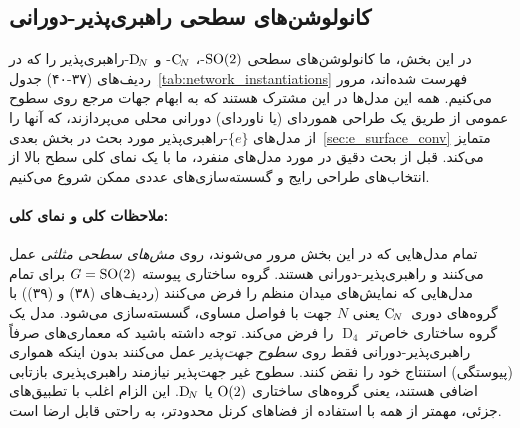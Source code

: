 

\subsection{کانولوشن‌های سطحی راهبری‌پذیر-دورانی}
\label{sec:so2_surface_conv}

در این بخش، ما کانولوشن‌های سطحی $\operatorname{SO}(2)$-، $\operatorname{C}_{\!N}$- و $\operatorname{D}_{\!N}$-راهبری‌پذیر را که در ردیف‌های (۳۷-۴۰) جدول~\ref{tab:network_instantiations} فهرست شده‌اند، مرور می‌کنیم.
همه این مدل‌ها در این مشترک هستند که به ابهام جهات مرجع روی سطوح عمومی از طریق یک طراحی هموردای (یا ناوردای) دورانی محلی می‌پردازند، که آنها را از مدل‌های $\{e\}$-راهبری‌پذیر مورد بحث در بخش بعدی~\ref{sec:e_surface_conv} متمایز می‌کند.
قبل از بحث دقیق در مورد مدل‌های منفرد، ما با یک نمای کلی سطح بالا از انتخاب‌های طراحی رایج و گسسته‌سازی‌های عددی ممکن شروع می‌کنیم.


\paragraph{ملاحظات کلی و نمای کلی:}
تمام مدل‌هایی که در این بخش مرور می‌شوند، روی \emph{مش‌های سطحی مثلثی} عمل می‌کنند و راهبری‌پذیر-دورانی هستند.
گروه ساختاری پیوسته $G=\operatorname{SO}(2)$ برای تمام مدل‌هایی که نمایش‌های میدان منظم را فرض می‌کنند (ردیف‌های (۳۸) و (۳۹)) با گروه‌های دوری~$\operatorname{C}_{\!N}$ یعنی $N$ جهت با فواصل مساوی، گسسته‌سازی می‌شود.
مدل \citet{huang2019texturenet} یک گروه ساختاری خاص‌تر $\operatorname{D}_4$ را فرض می‌کند.
توجه داشته باشید که معماری‌های صرفاً راهبری‌پذیر-دورانی فقط روی \emph{سطوح جهت‌پذیر} عمل می‌کنند بدون اینکه همواری (پیوستگی) استنتاج خود را نقض کنند.
سطوح غیر جهت‌پذیر نیازمند راهبری‌پذیری بازتابی اضافی هستند، یعنی گروه‌های ساختاری $\operatorname{O}(2)$ یا $\operatorname{D}_{\!N}$.
این الزام اغلب با تطبیق‌های جزئی، مهمتر از همه با استفاده از فضاهای کرنل محدودتر، به راحتی قابل ارضا است.


